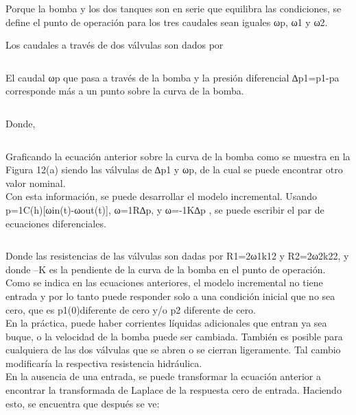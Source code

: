 \documentclass[a4paper,12pt,twoside]{proyectotanquesecci}
\begin{document}
Porque la bomba y los dos tanques son en serie que equilibra las condiciones, se define el punto de operación para los tres caudales sean iguales ωp, ω1 y ω2.


Los caudales a través de dos válvulas son dados por

\begin{equation}
\end{equation}

El caudal ωp que pasa a través de la bomba y la presión diferencial ∆p1=p1-pa corresponde más a un punto sobre la curva de la bomba.

\begin{equation}
\end{equation}

Donde,

\begin{equation}
\end{equation}

Graficando la ecuación anterior sobre la curva de la bomba como se muestra en la Figura 12(a) siendo las válvulas de ∆p1 y ωp, de la cual se puede encontrar otro valor nominal. \\
Con esta información, se puede desarrollar el modelo incremental. Usando p=1C(h)[ωin(t)-ωout(t)],  ω=1R∆p, y ω=-1K∆p , se puede escribir el par de ecuaciones diferenciales.

\begin{equation}
\end{equation}

Donde las resistencias de las válvulas son dadas por R1=2ω1k12 y R2=2ω2k22, y donde –K es la pendiente de la curva de la bomba en el punto de operación. Como se indica en las ecuaciones anteriores, el modelo incremental no tiene entrada y por lo tanto puede responder solo a una condición inicial que no sea cero, que es p1(0)diferente de cero y/o p2 diferente de cero. \\
En la práctica, puede haber corrientes líquidas adicionales que entran ya sea buque, o la velocidad de la bomba puede ser cambiada. También es posible para cualquiera de las dos válvulas que se abren o se cierran ligeramente. Tal cambio modificaría la respectiva resistencia hidráulica. \\
En la ausencia de una entrada, se puede transformar la ecuación anterior a encontrar la transformada de Laplace de la respuesta cero de entrada. Haciendo esto, se encuentra que después se ve:
\end{document}
